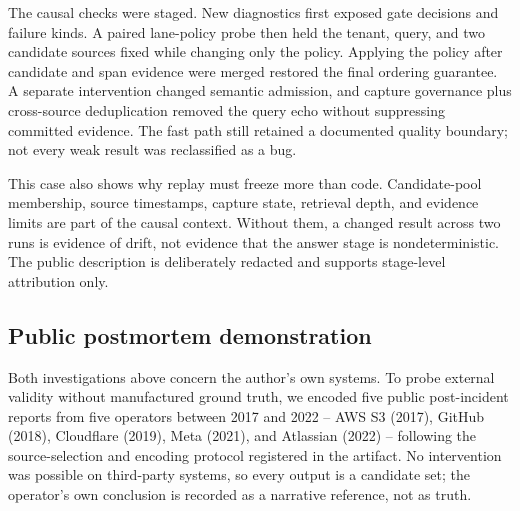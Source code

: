 \documentclass[10pt]{article}
\begin{document}
The causal checks were staged. New diagnostics first exposed gate decisions and failure kinds. A paired lane-policy probe then held the tenant, query, and two candidate sources fixed while changing only the policy. Applying the policy after candidate and span evidence were merged restored the final ordering guarantee. A separate intervention changed semantic admission, and capture governance plus cross-source deduplication removed the query echo without suppressing committed evidence. The fast path still retained a documented quality boundary; not every weak result was reclassified as a bug.

This case also shows why replay must freeze more than code. Candidate-pool membership, source timestamps, capture state, retrieval depth, and evidence limits are part of the causal context. Without them, a changed result across two runs is evidence of drift, not evidence that the answer stage is nondeterministic. The public description is deliberately redacted and supports stage-level attribution only.

\subsection{Public postmortem demonstration}
\label{sec:postmortems}

Both investigations above concern the author's own systems. To probe external validity without manufactured ground truth, we encoded five public post-incident reports from five operators between 2017 and 2022 -- AWS S3 (2017), GitHub (2018), Cloudflare (2019), Meta (2021), and Atlassian (2022) -- following the source-selection and encoding protocol registered in the artifact. No intervention was possible on third-party systems, so every output is a candidate set; the operator's own conclusion is recorded as a narrative reference, not as truth.
\end{document}
